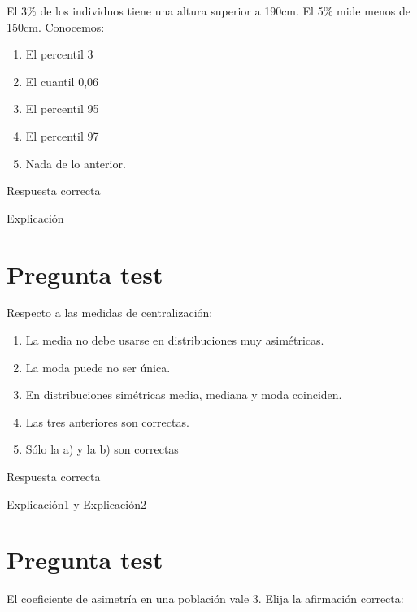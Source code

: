 \documentclass[
]{book}
\providecommand{\tightlist}{%
  \setlength{\itemsep}{0pt}\setlength{\parskip}{0pt}}
\begin{document}
El 3\% de los individuos tiene una altura superior a 190cm. El 5\% mide menos de 150cm. Conocemos:

\begin{enumerate}
\def\labelenumi{\alph{enumi})}
\tightlist
\item
  El percentil 3
\item
  El cuantil 0,06
\item
  El percentil 95
\item
  El percentil 97
\item
  Nada de lo anterior.
\end{enumerate}

Respuesta correcta

\href{https://1fjmanzano.github.io/bioestadistica/medidas-de-posicio\%CC\%81n-dispersio\%CC\%81n-y-forma.html\#medidas-de-posicio\%CC\%81n-no-centrales}{Explicación}

\hypertarget{pregunta-test-72}{%
\section{Pregunta test}\label{pregunta-test-72}}

Respecto a las medidas de centralización:

\begin{enumerate}
\def\labelenumi{\alph{enumi})}
\tightlist
\item
  La media no debe usarse en distribuciones muy asimétricas.
\item
  La moda puede no ser única.
\item
  En distribuciones simétricas media, mediana y moda coinciden.
\item
  Las tres anteriores son correctas.
\item
  Sólo la a) y la b) son correctas
\end{enumerate}

Respuesta correcta

\href{https://1fjmanzano.github.io/bioestadistica/medidas-de-forma.html}{Explicación1} y \href{https://www.statisticshowto.com/what-is-a-bimodal-distribution/}{Explicación2}

\hypertarget{pregunta-test-73}{%
\section{Pregunta test}\label{pregunta-test-73}}

El coeficiente de asimetría en una población vale 3. Elija la afirmación correcta:
\end{document}
